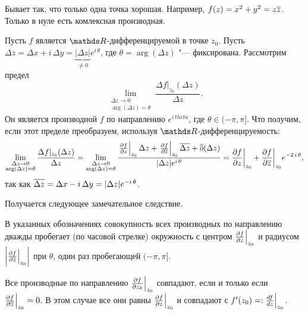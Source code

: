 Бывает так, что только одна точка хорошая. Например, $f(z) = x^2 +y^2 = z\overline{z}$. Только в нуле есть комлексная производная.
\begin{Zam}
	Пусть $f$ является $\R$-дифференцируемой в точке $z_0$. Пусть $\Delta z = \Delta x + i\,\Delta y = \underbrace{|\Delta z|}_{\ne0} e^{i\,\theta}$, где $\theta = \arg(\Delta z)$ "--- фиксирована. Рассмотрим предел
	\[
		\lim\limits_{\substack{\Delta z\to0 \\ \arg(\Delta z)=\theta}}\frac{\Delta f|_{z_0}(\Delta z)}{\Delta z}.
	\]
Он является производной $f$  по направлению $e^{i\,theta}$, где $\theta\in(-\pi,\pi]$. Что получим, если этот пределе преобразуем, используя $\R$-дифференцируемость:
\[
		\lim\limits_{\substack{\Delta z\rightarrow0 \\ \arg(\Delta z)=\theta}}\frac{\Delta f|_{z_0}(\Delta z)}{\Delta z}=
		\lim\limits_{\substack{\Delta z\rightarrow0 \\ \arg(\Delta z)=\theta}}
			\frac{\left.\frac{\partial f}{\partial z}\right|_{z_0}\Delta z + \left.\frac{\partial f}{\partial \overline{z}}\right|_{z_0}\overline{\Delta z} + \overline{\overline o}(\Delta z)}{|\Delta z|e^{i\,\theta}}=
			\frac{\partial f}{\partial z}\bigg|_{z_0} + \frac{\partial f}{\partial \overline{z}}\bigg|_{z_0}e^{-2\,i\,\theta},
		\]
		так как $\overline{\Delta z} = \Delta x - i\,\Delta y = |\Delta z|e^{-i\,\theta}$.
\end{Zam}
Получается следующее замечательное следствие.
\begin{Sl}
В указанных обозначениях совокупность всех производных по направлению дважды пробегает (по часовой стрелке) окружность с центром $\frac{\partial f}{\partial z}\Big|_{z_0}$ и радиусом $\bigg|\frac{\partial f}{\partial \overline{z}}\Big|_{z_0}\bigg|$ при $\theta$, один раз пробегающей $(-\pi,\pi]$.
\end{Sl}
\begin{Sl}
	Все производные по направлению $\frac{\partial f}{\partial z_\theta}\Big|_{z_0}$ совпадают, если и только если $\frac{\partial f}{\partial \overline{z}}\Big|_{z_0}=0$. В этом случае все они равны $\frac{\partial f}{\partial z}\Big|_{z_0}$ и совпадают с $f'(z_0) = :\frac{df}{dz}\Big|_{z_0}$.
\end{Sl}
